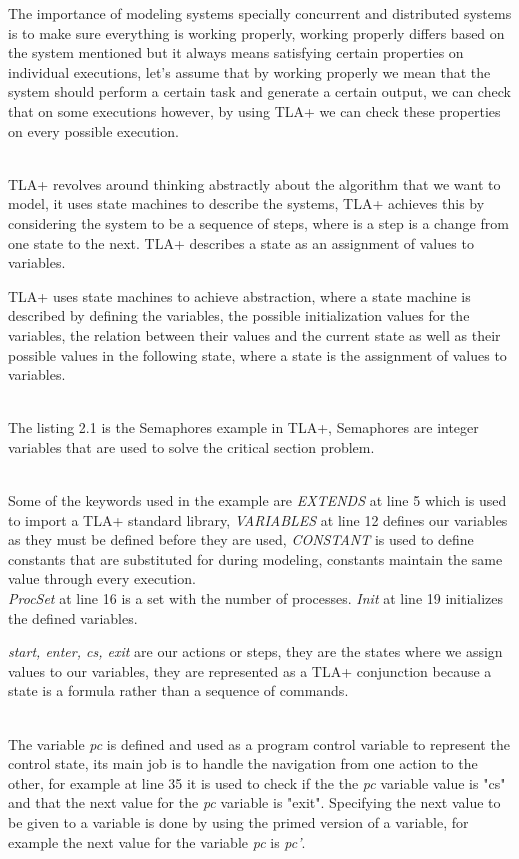 \documentclass{thesul}
\begin{document}
The importance of modeling systems specially concurrent and distributed systems is to make sure everything is working properly, working properly differs based on the system mentioned but it always means satisfying certain properties on individual executions, let's assume that by working properly we mean that the system should perform a certain task and generate a certain output, we can check that on some executions however, by using TLA+ we can check these properties on every possible execution.
 
\hfill\\
TLA+ revolves around thinking abstractly about the algorithm that we want to model, it uses state machines to describe the systems, TLA+ achieves this by considering the system to be a sequence of steps, where is a step is a change from one state to the next. TLA+ describes a state as an assignment of values to variables.

TLA+ uses state machines to achieve abstraction, where a state machine is described by defining the variables, the possible initialization values for the variables, the relation between their values and the current state as well as their possible values in the following state, where a state is the assignment of values to variables.

\hfill\\
The listing 2.1 is the Semaphores example in TLA+, Semaphores are integer variables that are used to solve the critical section problem.

\hfill\\
Some of the keywords used in the example are \textit{EXTENDS} at line 5 which is used to import a TLA+ standard library,  \textit{VARIABLES} at line 12 defines our variables as they must be defined before they are used, \textit{CONSTANT} is used to define constants that are substituted for during modeling, constants maintain the same value through every execution.
\hfill\\

\textit{ProcSet} at line 16 is a set with the number of processes. \textit{Init} at line 19 initializes the defined variables.

\textit{start, enter, cs, exit} are our actions or steps, they are the states where we assign values to our variables, they are represented as a TLA+ conjunction because a state is a formula rather than a sequence of commands.

\hfill\\
The variable \textit{pc} is defined and used as a program control variable to represent the control state, its main job is to handle the navigation from one action to the other, for example at line 35 it is used to check if the the \textit{pc} variable value is "cs" and that the next value for the \textit{pc} variable is "exit". Specifying the next value to be given to a variable is done by using the primed version of a variable, for example the next value for the variable \textit{pc} is \textit{pc'}.
\end{document}
